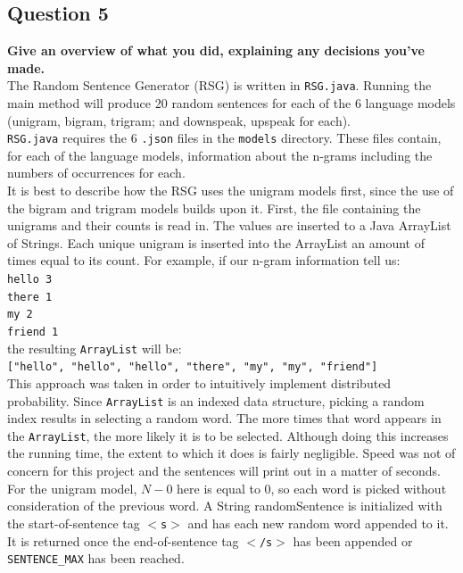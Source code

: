\documentclass{article} %
\begin{document}
\subsection*{Question 5}

\textbf{Give an overview of what you did, explaining any decisions you've made.}
\\

The Random Sentence Generator (RSG) is written in \texttt{RSG.java}. Running the main method will produce 20 random sentences for each of the 6 language models (unigram, bigram, trigram; and downspeak, upspeak for each).\\

\texttt{RSG.java} requires the 6 \texttt{.json} files in the \texttt{models} directory. These files contain, for each of the language models, information about the n-grams including the numbers of occurrences for each.\\

It is best to describe how the RSG uses the unigram models first, since the use of the bigram and trigram models builds upon it. First, the file containing the unigrams and their counts is read in. The values are inserted to a Java ArrayList of Strings. Each unique unigram is inserted into the ArrayList an amount of times equal to its count. For example, if our n-gram information tell us:\\

\texttt{hello 3\\
there 1\\
my 2\\
friend 1}\\

the resulting  \texttt{ArrayList} will be:\\

\texttt{["hello", "hello", "hello", "there", "my", "my", "friend"]}\\

This approach was taken in order to intuitively implement distributed probability. Since  \texttt{ArrayList} is an indexed data structure, picking a random index results in selecting a random word. The more times that word appears in the  \texttt{ArrayList}, the more likely it is to be selected. Although doing this increases the running time, the extent to which it does is fairly negligible. Speed was not of concern for this project and the sentences will print out in a matter of seconds.\\

For the unigram model, $N - 0$ here is equal to 0, so each word is picked without consideration of the previous word. A String randomSentence is initialized with the start-of-sentence tag  \texttt{$<$s$>$} and has each new random word appended to it. It is returned once the end-of-sentence tag  \texttt{$<$/s$>$} has been appended or  \texttt{SENTENCE\_MAX} has been reached.\\
\end{document}
